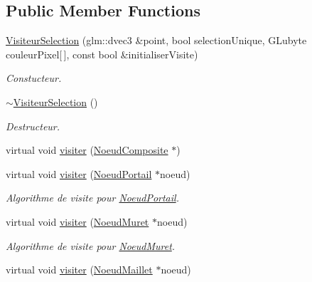 \subsection*{Public Member Functions}
\begin{DoxyCompactItemize}
\item 
\hypertarget{class_visiteur_selection_abfa92ff155e59d64ab79d2f6530715ff}{}\label{class_visiteur_selection_abfa92ff155e59d64ab79d2f6530715ff} 
\hyperlink{class_visiteur_selection_abfa92ff155e59d64ab79d2f6530715ff}{Visiteur\+Selection} (glm\+::dvec3 \&point, bool selection\+Unique, G\+Lubyte couleur\+Pixel\mbox{[}$\,$\mbox{]}, const bool \&initialiser\+Visite)
\begin{DoxyCompactList}\small\item\em Constucteur. \end{DoxyCompactList}\item 
\hypertarget{class_visiteur_selection_af74044cdf22e6bdc2a4cd8c5afafdc60}{}\label{class_visiteur_selection_af74044cdf22e6bdc2a4cd8c5afafdc60} 
\hyperlink{class_visiteur_selection_af74044cdf22e6bdc2a4cd8c5afafdc60}{$\sim$\+Visiteur\+Selection} ()
\begin{DoxyCompactList}\small\item\em Destructeur. \end{DoxyCompactList}\item 
virtual void \hyperlink{group__inf2990_gaf6d77b8c875bda7f01434cf4e834599c}{visiter} (\hyperlink{class_noeud_composite}{Noeud\+Composite} $\ast$)
\item 
virtual void \hyperlink{group__inf2990_ga5576bd68b32506507c788027a8804cff}{visiter} (\hyperlink{class_noeud_portail}{Noeud\+Portail} $\ast$noeud)
\begin{DoxyCompactList}\small\item\em Algorithme de visite pour \hyperlink{class_noeud_portail}{Noeud\+Portail}. \end{DoxyCompactList}\item 
virtual void \hyperlink{group__inf2990_ga91d77668ef5dad7e42a9d9876d7464da}{visiter} (\hyperlink{class_noeud_muret}{Noeud\+Muret} $\ast$noeud)
\begin{DoxyCompactList}\small\item\em Algorithme de visite pour \hyperlink{class_noeud_muret}{Noeud\+Muret}. \end{DoxyCompactList}\item 
virtual void \hyperlink{group__inf2990_ga6b291b464d019af9696d2916ae58dc23}{visiter} (\hyperlink{class_noeud_maillet}{Noeud\+Maillet} $\ast$noeud)

\end{DoxyCompactItemize}
